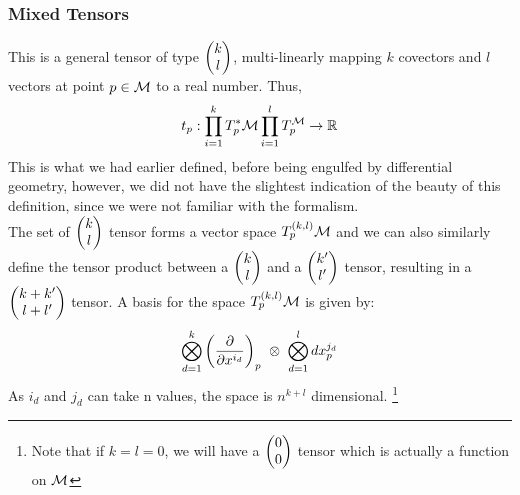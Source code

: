 \subsubsection{Mixed Tensors}
This is a general tensor of type $\mqty(k\\l)$, multi-linearly mapping $k$ covectors and $l$ vectors at point $p\in\mathcal M$ to a real number. Thus, 
$$t_p: \prod_{i=1}^{k}T_p^*\mathcal M\prod_{i=1}^{l}T_p^\mathcal M \rightarrow \mathbb{R}$$
This is what we had earlier defined, before being engulfed by differential geometry, however, we did not have the slightest indication of the beauty of this definition, since we were not familiar with the formalism. \\[0.2cm]
The set of $\mqty(k\\l)$ tensor forms a vector space $T_p^{(k,l)}\mathcal M$ and we can also similarly define the tensor product between a $\mqty(k\\l)$ and a $\mqty(k'\\l')$ tensor, resulting in a $\mqty(k+k'\\l+l')$ tensor. A basis for the space $T_p^{(k,l)}\mathcal M$ is given by:
$$\bigotimes_{d=1}^k \qty(\pdv{x^{i_d}})_p\ \otimes \ \bigotimes_{d=1}^l dx_p^{j_d}$$
As $i_d$ and $j_d$ can take n values, the space is $n^{k+l}$ dimensional. \footnote{Note that if $k=l=0$, we will have a $\mqty(0\\0)$ tensor which is actually a function on $\mathcal M$}
